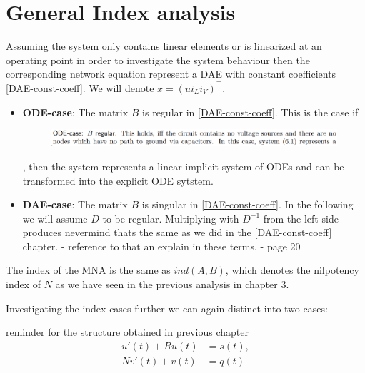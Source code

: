\section{General Index analysis}

Assuming the system only contains linear elements or is linearized at an operating point in order to investigate the system behaviour then the corresponding network equation represent a DAE with constant coefficients \ref{DAE-const-coeff}. We will denote $x=(u i_L i_V)^\top$.

\begin{itemize}
	\item \textbf{ODE-case}: \newline
	The matrix $B$ is regular in \ref{DAE-const-coeff}. This is the case if
	\begin{figure}[H]
		\centering
		\includegraphics[width=0.7\linewidth]{screenshot006}
		\caption{}
		\label{fig:screenshot006}
	\end{figure}
	, then the system represents  a linear-implicit system of ODEs and can be transformed into the explicit ODE sytstem.
		
	\item \textbf{DAE-case}:
	The matrix $B$ is singular in \ref{DAE-const-coeff}. In the following we will assume $D$ to be regular. Multiplying with $D^{-1}$ from the left side produces
	\newline
	nevermind thats the same as we did in the \ref{DAE-const-coeff} chapter. - reference to that an explain in these terms. - page 20
\end{itemize}

The index of the MNA is the same as $ind(A,B)$, which denotes the nilpotency index of $N$ as we have seen in the previous analysis in chapter 3.


Investigating the index-cases further we can again distinct into two cases:

reminder for the structure obtained in previous chapter
\begin{align*}
	u'(t) + Ru(t) &= s(t), \\
	Nv'(t) + v(t) &= q(t)
\end{align*}

